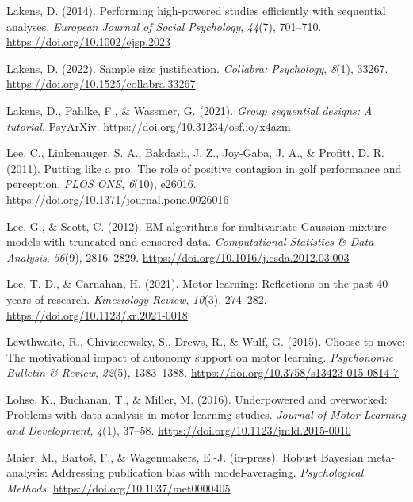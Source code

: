 \documentclass[
  man, donotrepeattitle,floatsintext]{apa7}
\newlength{\cslhangindent}
\newlength{\cslentryspacingunit} %
\newenvironment{CSLReferences}[2] %
 {%
  \setlength{\parindent}{0pt}
  \ifodd #1
  \let\oldpar\par
  \def\par{\hangindent=\cslhangindent\oldpar}
  \fi
  \setlength{\parskip}{#2\cslentryspacingunit}
 }%
 {}
\begin{document}
\begin{CSLReferences}{1}{0}
\leavevmode{}%
Lakens, D. (2014). Performing high-powered studies efficiently with sequential analyses. \emph{European Journal of Social Psychology}, \emph{44}(7), 701--710. \url{https://doi.org/10.1002/ejsp.2023}

\leavevmode{}%
Lakens, D. (2022). Sample size justification. \emph{Collabra: Psychology}, \emph{8}(1), 33267. \url{https://doi.org/10.1525/collabra.33267}

\leavevmode{}%
Lakens, D., Pahlke, F., \& Wassmer, G. (2021). \emph{Group sequential designs: A tutorial}. {PsyArXiv}. \url{https://doi.org/10.31234/osf.io/x4azm}

\leavevmode{}%
Lee, C., Linkenauger, S. A., Bakdash, J. Z., Joy-Gaba, J. A., \& Profitt, D. R. (2011). Putting like a pro: The role of positive contagion in golf performance and perception. \emph{PLOS ONE}, \emph{6}(10), e26016. \url{https://doi.org/10.1371/journal.pone.0026016}

\leavevmode{}%
Lee, G., \& Scott, C. (2012). {EM} algorithms for multivariate {Gaussian} mixture models with truncated and censored data. \emph{Computational Statistics \& Data Analysis}, \emph{56}(9), 2816--2829. \url{https://doi.org/10.1016/j.csda.2012.03.003}

\leavevmode{}%
Lee, T. D., \& Carnahan, H. (2021). Motor learning: Reflections on the past 40 years of research. \emph{Kinesiology Review}, \emph{10}(3), 274--282. \url{https://doi.org/10.1123/kr.2021-0018}

\leavevmode{}%
Lewthwaite, R., Chiviacowsky, S., Drews, R., \& Wulf, G. (2015). Choose to move: The motivational impact of autonomy support on motor learning. \emph{Psychonomic Bulletin \& Review}, \emph{22}(5), 1383--1388. \url{https://doi.org/10.3758/s13423-015-0814-7}

\leavevmode{}%
Lohse, K., Buchanan, T., \& Miller, M. (2016). Underpowered and overworked: Problems with data analysis in motor learning studies. \emph{Journal of Motor Learning and Development}, \emph{4}(1), 37--58. \url{https://doi.org/10.1123/jmld.2015-0010}

\leavevmode{}%
Maier, M., Bartoš, F., \& Wagenmakers, E.-J. (in-press). Robust {Bayesian} meta-analysis: Addressing publication bias with model-averaging. \emph{Psychological Methods}. \url{https://doi.org/10.1037/met0000405}


\end{CSLReferences}
\end{document}
